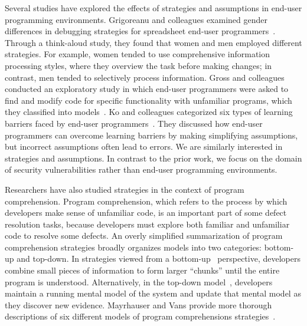 \documentclass[10pt,journal,compsoc]{IEEEtran}
\begin{document}
Several studies have explored the effects of strategies and assumptions in end-user programming environments.
Grigoreanu and colleagues examined gender differences in debugging strategies for spreadsheet end-user programmers~\cite{Grigoreanu:2012:sense, Grigoreanu:2009}. 
Through a think-aloud study, they found that women and men employed different strategies. 
For example, women tended to use comprehensive information processing styles, where they overview the task before making changes; in contrast, men tended to selectively process information.
Gross and colleagues conducted an exploratory study in which end-user programmers were asked to find and modify code for specific functionality with unfamiliar programs, which they classified into models~\cite{Gross:2010}.
Ko and colleagues categorized six types of learning barriers faced by end-user programmers~\cite{Ko:2004:barriers}.
They discussed how end-user programmers can overcome learning barriers by making simplifying assumptions, but incorrect assumptions often lead to errors.
We are similarly interested in strategies and assumptions.
In contrast to the prior work, we focus on the domain of security vulnerabilities rather than end-user programming environments.


Researchers have also studied strategies in the context of program comprehension.
Program comprehension, which refers to the process by which developers make sense of unfamiliar code, is an important part of some defect resolution tasks, because developers must explore both familiar and unfamiliar code to resolve some defects.
An overly simplified summarization of program comprehension strategies broadly organizes models into two categories: bottom-up and top-down.
In strategies viewed from a bottom-up~\cite{shneiderman1979syntactic} perspective, developers combine small pieces of information to form larger ``chunks'' until the entire program is understood.
Alternatively, in the top-down model~\cite{brooks1977towards}, developers maintain a running mental model of the system and update that mental model as they discover new evidence. 
Mayrhauser and Vans provide more thorough descriptions of six different models of program comprehensions strategies~\cite{von1995program}.

\end{document}
